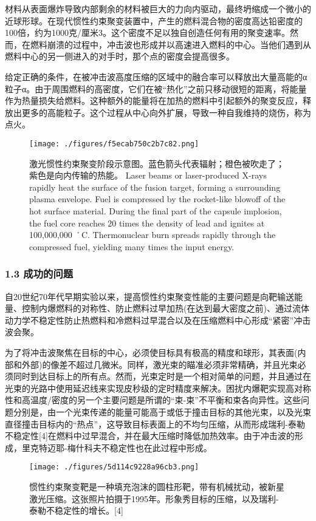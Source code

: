 材料从表面爆炸导致内部剩余的材料被巨大的力向内驱动，最终坍缩成一个微小的近球形球。在现代惯性约束聚变装置中，产生的燃料混合物的密度高达铅密度的100倍，约为1000克/厘米3。这个密度不足以独自创造任何有用的聚变速率。然而，在燃料崩溃的过程中，冲击波也形成并以高速进入燃料的中心。当他们遇到从燃料中心的另一侧进入的对手时，那个点的密度会提高很多。

给定正确的条件，在被冲击波高度压缩的区域中的融合率可以释放出大量高能的α粒子α。由于周围燃料的高密度，它们在被“热化”之前只移动很短的距离，将能量作为热量损失给燃料。这种额外的能量将在加热的燃料中引起额外的聚变反应，释放出更多的高能粒子。这个过程从中心向外扩展，导致一种自我维持的烧伤，称为点火。
\begin{figure}[ht]
\centering
\texttt{[image: ./figures/f5ecab750c2b7c82.png]}
\caption{激光惯性约束聚变阶段示意图。蓝色箭头代表辐射；橙色被吹走了；紫色是向内传输的热能。 Laser beams or laser-produced X-rays rapidly heat the surface of the fusion target, forming a surrounding plasma envelope. Fuel is compressed by the rocket-like blowoff of the hot surface material. During the final part of the capsule implosion, the fuel core reaches 20 times the density of lead and ignites at 100,000,000 ˚C. Thermonuclear burn spreads rapidly through the compressed fuel, yielding many times the input energy.} \label{fig_GXYS_2}
\end{figure}
\subsubsection{1.3 成功的问题}
自20世纪70年代早期实验以来，提高惯性约束聚变性能的主要问题是向靶输送能量、控制内爆燃料的对称性、防止燃料过早加热(在达到最大密度之前)、通过流体动力学不稳定性防止热燃料和冷燃料过早混合以及在压缩燃料中心形成“紧密”冲击波会聚。

为了将冲击波聚焦在目标的中心，必须使目标具有极高的精度和球形，其表面(内部和外部)的像差不超过几微米。同样，激光束的瞄准必须非常精确，并且光束必须同时到达目标上的所有点。然而，光束定时是一个相对简单的问题，并且通过在光束的光路中使用延迟线来实现皮秒级的定时精度来解决。困扰内爆靶实现高对称性和高温度/密度的另一个主要问题是所谓的“束-束”不平衡和束各向异性。这些问题分别是，由一个光束传递的能量可能高于或低于撞击目标的其他光束，以及光束直径撞击目标内的“热点”，这导致目标表面上的不均匀压缩，从而形成瑞利-泰勒不稳定性[4]在燃料中过早混合，并在最大压缩时降低加热效率。由于冲击波的形成，里克特迈耶-梅什科夫不稳定性也在此过程中形成。
\begin{figure}[ht]
\centering
\texttt{[image: ./figures/5d114c9228a96cb3.png]}
\caption{惯性约束聚变靶是一种填充泡沫的圆柱形靶，带有机械扰动，被新星激光压缩。这张照片拍摄于1995年。形象秀目标的压缩，以及瑞利-泰勒不稳定性的增长。[4]} \label{fig_GXYS_3}
\end{figure}